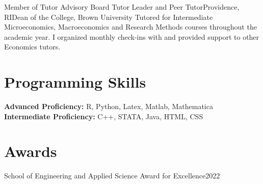 \documentclass[10pt,a4paper,roman]{moderncv}        %
\begin{document}
{Member of Tutor Advisory Board}
{Tutor Leader and Peer Tutor}{Providence, RI}{Dean of the College, Brown
  University}
{Tutored for Intermediate Microeconomics,
  Macroeconomics
  and Research Methods courses throughout the academic year.
  I organized monthly check-ins with and provided support to other Economics tutors.}


\section{Programming Skills}
\textbf{Advanced Proficiency: } R, Python, Latex, Matlab, Mathematica\\
\textbf{Intermediate Proficiency: } C++, STATA, Java, HTML, CSS


\section{Awards}
{School of Engineering and Applied Science Award for Excellence}{2022}
{}{}
\end{document}
